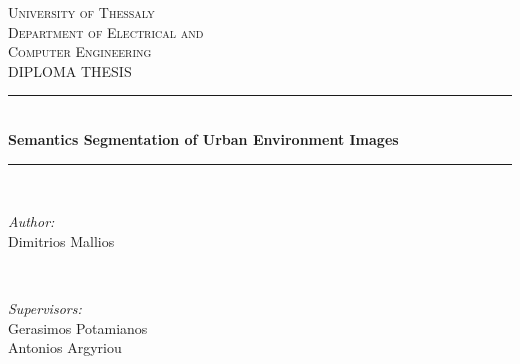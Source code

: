 \begin{titlepage}
\newcommand{\HRule}{\rule{\linewidth}{0.5mm}} %

\center %
 

\textsc{\LARGE University of Thessaly}\\[1.5cm] %
\textsc{\Large Department of Electrical and \\ Computer Engineering}\\[0.5cm] %
\textsc{\large DIPLOMA THESIS}\\[0.5cm] %


\HRule \\[0.4cm]
{ \huge \bfseries Semantics Segmentation of Urban Environment Images}\\[0.4cm] %
\HRule \\[1.5cm]
 

\begin{minipage}{0.4\textwidth}
\begin{flushleft} \large
\emph{Author:}\\
Dimitrios Mallios %
\end{flushleft}
\end{minipage}
~
\begin{minipage}{0.4\textwidth}
\begin{flushright} \large
\emph{Supervisors:} \\
Gerasimos Potamianos \\
Antonios Argyriou %
\end{flushright}
\end{minipage}\\[4cm]


\end{titlepage}

